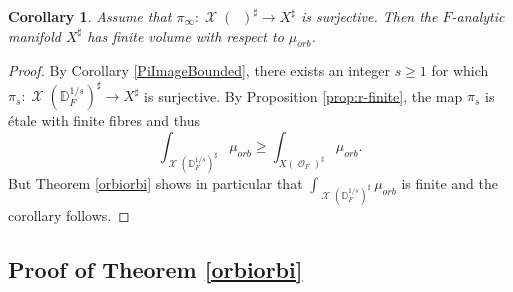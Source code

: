 \documentclass{article}
\DeclareMathOperator{\Xc}{\mathcal{X}}
\DeclareMathOperator{\Oc}{\mathcal{O}}
\newcommand{\Dr}[1][r]{\mathbb{D}_F^{1/#1}}
\DeclareMathOperator{\Dinfty}{\mathbb{D}_F^{1/\infty}}
\theoremstyle{definition}
\theoremstyle{plain}
\newtheorem{corollary}[definition]{Corollary}
\begin{document}
\begin{corollary}\label{finvol} Assume that $\pi_\infty: \Xc(\Dinfty)^\sharp \to X^\sharp $ is surjective. Then the $F$-analytic manifold $X^\sharp$ has finite volume with respect to $\mu_{orb}$. 
\end{corollary}
\begin{proof}
By Corollary \ref{PiImageBounded}, there exists an integer $s\geq 1$ for which $\pi_s: \Xc(\Dr[s])^\sharp \to X^\sharp $ is surjective. By Proposition \ref{prop:r-finite}, the map $\pi_s$ is étale with finite fibres and thus
\[\int_{\Xc(\Dr[s])^\sharp}\mu_{orb} \geq \int_{X(\Oc_F)^\sharp}\mu_{orb}.
  \]
But Theorem \ref{orbiorbi} shows in particular that $\int_{\Xc(\Dr[s])^\sharp}\mu_{orb}$ is finite and the corollary follows.    
\end{proof}



\subsection{Proof of Theorem \ref{orbiorbi}}
\end{document}
